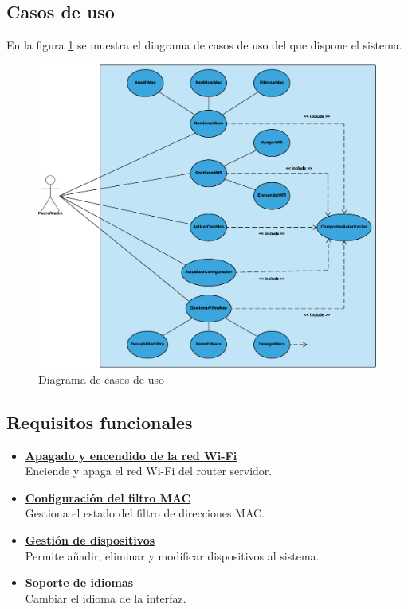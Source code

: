\documentclass[12pt, twoside]{article}
\begin{document}
    \subsection{Casos de uso}
        En la figura \ref{fig:case_use_diagram} se muestra el diagrama de casos de uso del que dispone el sistema.
        \begin{figure}[h!]
        \centering
            \includegraphics[scale=0.35]{case_use_diagram.eps}
            \caption{Diagrama de casos de uso}
            \label{fig:case_use_diagram}
        \end{figure}
    
    \subsection{Requisitos funcionales}
        \begin{itemize}
            \item \textbf{\underline{Apagado y encendido de la red Wi-Fi}} \\
            Enciende y apaga el red Wi-Fi del router servidor. 
            \item \textbf{\underline{Configuración del filtro MAC}} \\
            Gestiona el estado del filtro de direcciones MAC.
            \item \textbf{\underline{Gestión de dispositivos}} \\
            Permite añadir, eliminar y modificar dispositivos al sistema.
            \item \textbf{\underline{Soporte de idiomas}} \\
            Cambiar el idioma de la interfaz.
        \end{itemize}
    
\end{document}
